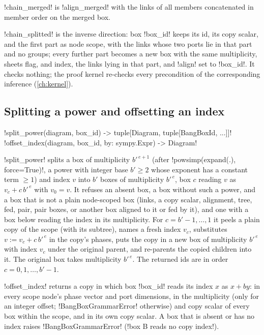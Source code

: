 \py!chain_merged! is \py!align_merged! with the links of all members concatenated in member order on the merged box.

\py!chain_splitted! is the inverse direction: box \py!box_id! keeps its id, its copy scalar, and the first part as node scope, with the links whose two ports lie in that part and no groups; every further part becomes a new box with the same multiplicity, sheets flag, and index, the links lying in that part, and \py!align! set to \py!box_id!. It checks nothing; the proof kernel re-checks every precondition of the corresponding inference (\cref{ch:kernel}).

\subsection{Splitting a power and offsetting an index}

\begin{signature}
\py!split_power(diagram, box_id) -> tuple[Diagram, tuple[BangBoxId, ...]]!\\
\py!offset_index(diagram, box_id, by: sympy.Expr) -> Diagram!
\end{signature}

\py!split_power! splits a box of multiplicity $b'^{\,e+1}$ (after \py!powsimp(expand(.), force=True)!, a power with integer base $b'\ge 2$ whose exponent has a constant term $\ge 1$) and index $v$ into $b'$ boxes of multiplicity $b'^{\,e}$, box $c$ reading $v$ as $v_c+c\,b'^{\,e}$ with $v_0=v$. It refuses an absent box, a box without such a power, and a box that is not a plain node-scoped box (links, a copy scalar, alignment, tree, fed, pair, pair boxes, or another box aligned to it or fed by it), and one with a box below reading the index in its multiplicity. For $c=b'-1,\dots,1$ it peels a plain copy of the scope (with its subtree), names a fresh index $v_c$, substitutes $v:=v_c+c\,b'^{\,e}$ in the copy's phases, puts the copy in a new box of multiplicity $b'^{\,e}$ with index $v_c$ under the original parent, and re-parents the copied children into it. The original box takes multiplicity $b'^{\,e}$. The returned ids are in order $c=0,1,\dots,b'-1$.

\py!offset_index! returns a copy in which box \py!box_id! reads its index $x$ as $x+\textit{by}$: in every scope node's phase vector and port dimensions, in the multiplicity (only for an integer offset; \py!BangBoxGrammarError! otherwise) and copy scalar of every box within the scope, and in its own copy scalar. A box that is absent or has no index raises \py!BangBoxGrammarError! (\code!box B reads no copy index!).

